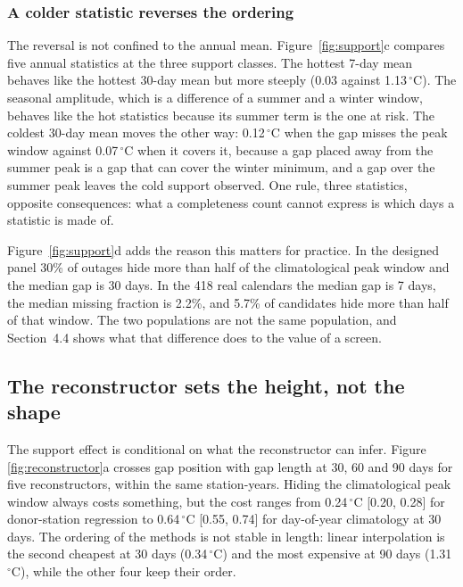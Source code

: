 \documentclass[draft]{agujournal2025}
\begin{document}
\subsubsection{A colder statistic reverses the ordering}

The reversal is not confined to the annual mean. Figure~\ref{fig:support}c
compares five annual statistics at the three support classes. The hottest 7-day
mean behaves like the hottest 30-day mean but more steeply (0.03 against
1.13\,$^{\circ}$C). The seasonal amplitude, which is a difference of a summer and
a winter window, behaves like the hot statistics because its summer term is the
one at risk. The coldest 30-day mean moves the other way: 0.12\,$^{\circ}$C when
the gap misses the peak window against 0.07\,$^{\circ}$C when it covers it,
because a gap placed away from the summer peak is a gap that can cover the
winter minimum, and a gap over the summer peak leaves the cold support observed.
One rule, three statistics, opposite consequences: what a completeness count
cannot express is which days a statistic is made of.

Figure~\ref{fig:support}d adds the reason this matters for practice. In the
designed panel 30\% of outages hide more than half of the climatological peak
window and the median gap is 30 days. In the 418 real calendars the median gap is
7 days, the median missing fraction is 2.2\%, and 5.7\% of candidates hide more
than half of that window. The two populations are not the same population, and Section~4.4
shows what that difference does to the value of a screen.

\subsection{The reconstructor sets the height, not the shape}

The support effect is conditional on what the reconstructor can infer. Figure
\ref{fig:reconstructor}a crosses gap position with gap length at 30, 60 and 90
days for five reconstructors, within the same station-years. Hiding the climatological
peak window always costs something, but the cost ranges from
0.24\,$^{\circ}$C [0.20, 0.28] for donor-station regression to
0.64\,$^{\circ}$C [0.55, 0.74] for day-of-year climatology at 30 days. The
ordering of the methods is not stable in length: linear interpolation is the
second cheapest at 30 days (0.34\,$^{\circ}$C) and the most expensive at 90 days
(1.31\,$^{\circ}$C), while the other four keep their order.
\end{document}
